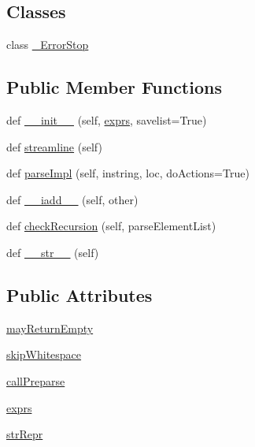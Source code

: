 \subsection*{Classes}
\begin{DoxyCompactItemize}
\item 
class \hyperlink{classpyparsing_1_1And_1_1__ErrorStop}{\+\_\+\+Error\+Stop}
\end{DoxyCompactItemize}
\subsection*{Public Member Functions}
\begin{DoxyCompactItemize}
\item 
def \hyperlink{classpyparsing_1_1And_a7d545999e60093ae923593d5d107b3c8}{\+\_\+\+\_\+init\+\_\+\+\_\+} (self, \hyperlink{classpyparsing_1_1And_aa83563fb8475ce7dc34f70dd8265f855}{exprs}, savelist=True)
\item 
def \hyperlink{classpyparsing_1_1And_ae7b05ff616b1018a523ac1ccfdabd4aa}{streamline} (self)
\item 
def \hyperlink{classpyparsing_1_1And_aef78156903ff82d8e5cd11ad70c39297}{parse\+Impl} (self, instring, loc, do\+Actions=True)
\item 
def \hyperlink{classpyparsing_1_1And_a1f2a748fb795638a7f2af39ee056d625}{\+\_\+\+\_\+iadd\+\_\+\+\_\+} (self, other)
\item 
def \hyperlink{classpyparsing_1_1And_af5d6481121fbc54ea739dfc6d5ca86e8}{check\+Recursion} (self, parse\+Element\+List)
\item 
def \hyperlink{classpyparsing_1_1And_a338a088df0b4c274c503a1dc8dea545a}{\+\_\+\+\_\+str\+\_\+\+\_\+} (self)
\end{DoxyCompactItemize}
\subsection*{Public Attributes}
\begin{DoxyCompactItemize}
\item 
\hyperlink{classpyparsing_1_1And_af4759c7296bcea93495a07a0f07d15a6}{may\+Return\+Empty}
\item 
\hyperlink{classpyparsing_1_1And_a9f5c1d095dcd098bdf3d7ce613b8b26c}{skip\+Whitespace}
\item 
\hyperlink{classpyparsing_1_1And_abed7c2635e6f58a3b694450e93ac634a}{call\+Preparse}
\item 
\hyperlink{classpyparsing_1_1And_aa83563fb8475ce7dc34f70dd8265f855}{exprs}
\item 
\hyperlink{classpyparsing_1_1And_a67fc09049dff43cae923a86f7143e671}{str\+Repr}
\end{DoxyCompactItemize}
